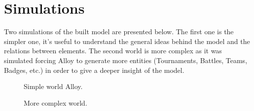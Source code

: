 

\section{Simulations}
\label{sec: sim}%
Two simulations of the built model are presented below.
The first one is the simpler one, it's useful to understand the general ideas behind the model and the relations between elements.
The second world is more complex as it was simulated forcing Alloy to generate more entities (Tournaments, Battles, Teams, Badges, etc.) 
in order to give a deeper insight of the model.

\begin{sidewaysfigure}
	\begin{figure} [H]
		\begin{center}
			\caption{Simple world Alloy.}
			\label{fig: simple_world_alloy}
		\end{center}
	\end{figure}
\end{sidewaysfigure}

\begin{sidewaysfigure}
	\begin{figure} [H]
		\begin{center}
			\caption{More complex world.}
			\label{fig: many_appointments_world_alloy}
		\end{center}
	\end{figure}
\end{sidewaysfigure}